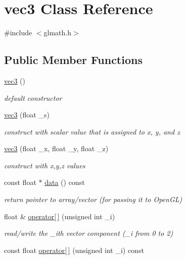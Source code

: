 \hypertarget{classvec3}{}\section{vec3 Class Reference}
\label{classvec3}


{\ttfamily \#include $<$glmath.\+h$>$}

\subsection*{Public Member Functions}
\begin{DoxyCompactItemize}
\item 
\hyperlink{classvec3_aea9f3480a6ccd7ce3ab02d0992705d33}{vec3} ()
\begin{DoxyCompactList}\small\item\em default constructor \end{DoxyCompactList}\item 
\hyperlink{classvec3_af902ab814c57dce9ef4b4338a6d1cf15}{vec3} (float \+\_\+s)
\begin{DoxyCompactList}\small\item\em construct with scalar value that is assigned to x, y, and z \end{DoxyCompactList}\item 
\hyperlink{classvec3_a3a09e4c9786a5c24516ec276356ace0f}{vec3} (float \+\_\+x, float \+\_\+y, float \+\_\+z)
\begin{DoxyCompactList}\small\item\em construct with x,y,z values \end{DoxyCompactList}\item 
const float $\ast$ \hyperlink{classvec3_a1a66cc42a5dcff64504d0ce66243324f}{data} () const 
\begin{DoxyCompactList}\small\item\em return pointer to array/vector (for passing it to Open\+GL) \end{DoxyCompactList}\item 
float \& \hyperlink{classvec3_a3cc802e184afe3a5b8117e3ded51a24a}{operator\mbox{[}$\,$\mbox{]}} (unsigned int \+\_\+i)
\begin{DoxyCompactList}\small\item\em read/write the \+\_\+i\textquotesingle{}th vector component (\+\_\+i from 0 to 2) \end{DoxyCompactList}\item 
const float \hyperlink{classvec3_a75093b5502a2ff003645a1e313446430}{operator\mbox{[}$\,$\mbox{]}} (unsigned int \+\_\+i) const 

\end{DoxyCompactItemize}
